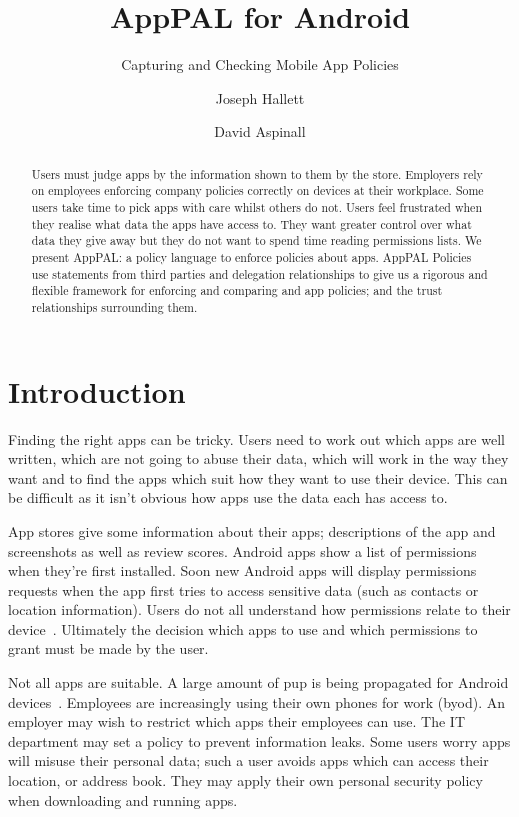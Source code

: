 \documentclass[]{llncs}
\title{AppPAL for Android}
\subtitle{Capturing and Checking Mobile App Policies}
\author{Joseph Hallett \and David Aspinall }
\institute{University of Edinburgh}
\newcommand{\comment}[1]{}%
\begin{document}
\maketitle{}

\begin{abstract}
  Users must judge apps by the information shown to them by the store.
  Employers rely on employees enforcing company policies correctly on devices at their workplace.
  Some users take time to pick apps with care whilst others do not.
  Users feel frustrated when they realise what data the apps have access to.
  They want greater control over what data they give away but they do not want to spend time reading permissions lists.
  We present AppPAL: a policy language to enforce policies about apps.
  AppPAL Policies use statements from third parties and delegation relationships to
  give us a rigorous and flexible framework for enforcing and comparing and app policies; and the trust relationships surrounding them.
\end{abstract}

\section{Introduction \comment{1 page}}
\label{sec:introduction}

Finding the right apps can be tricky.
Users need to work out which apps are well written, which are not going to abuse their data, which will work in the way they want
  and to find the apps which suit how they want to use their device.
This can be difficult as it isn't obvious how apps use the data each has access to.

App stores give some information about their apps; descriptions of the app and screenshots as well as review scores.
Android apps show a list of permissions when they're first installed.
Soon new Android apps will display permissions requests when the app first tries to access sensitive data (such as contacts or location information).
Users do not all understand how permissions relate to their device~\cite{Felt:2012hm,Thompson:2013eb}.
Ultimately the decision which apps to use and which permissions to grant must be made by the user.

Not all apps are suitable.
A large amount of \ac{pup} is being propagated for Android devices~\cite{Truong:2014bi,Svajcer:2013tp}.
Employees are increasingly using their own phones for work (\ac{byod}).
An employer may wish to restrict which apps their employees can use.
The IT department may set a policy to prevent information leaks.
Some users worry apps will misuse their personal data;
  such a user avoids apps which can access their location, or address book.
They may apply their own personal security policy when downloading and running apps.
\end{document}
